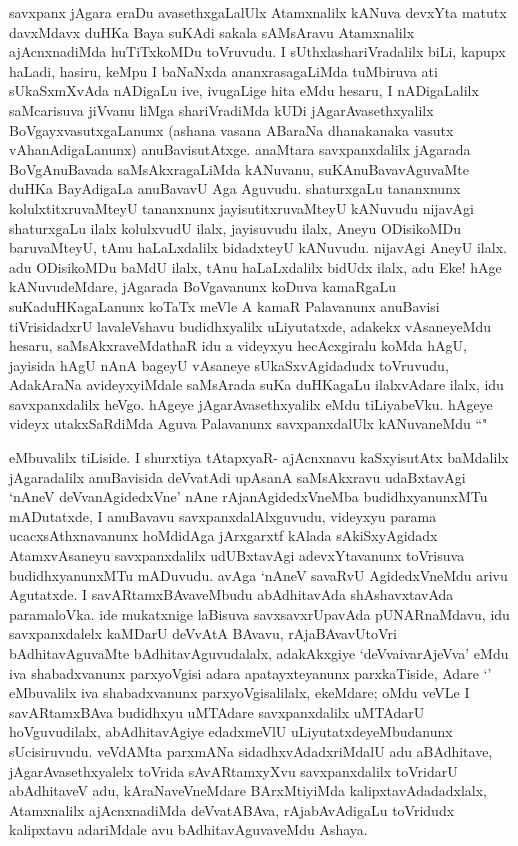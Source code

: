 \begin{artha}
savxpanx jAgara eraDu avasethxgaLalUlx Atamxnalilx kANuva devxYta matutx davxMdavx duHKa Baya suKAdi sakala sAMsAravu Atamxnalilx ajAcnxnadiMda huTiTxkoMDu toVruvudu. I sUthxlashariVradalilx biLi, kapupx haLadi, hasiru, keMpu I baNaNxda ananxrasagaLiMda tuMbiruva ati sUkaSxmXvAda nADigaLu ive, ivugaLige hita eMdu hesaru, I nADigaLalilx saMcarisuva jiVvanu liMga shariVradiMda kUDi jAgarAvasethxyalilx BoVgayxvasutxgaLanunx (ashana vasana ABaraNa dhanakanaka vasutx vAhanAdigaLanunx) anuBavisutAtxge. anaMtara savxpanxdalilx jAgarada BoVgAnuBavada saMsAkxragaLiMda kANuvanu, suKAnuBavavAguvaMte duHKa BayAdigaLa anuBavavU Aga Aguvudu. shaturxgaLu tananxnunx kolulxtitxruvaMteyU tananxnunx jayisutitxruvaMteyU kANuvudu nijavAgi shaturxgaLu ilalx kolulxvudU ilalx, jayisuvudu ilalx, Aneyu ODisikoMDu baruvaMteyU, tAnu haLaLxdalilx bidadxteyU kANuvudu. nijavAgi AneyU ilalx. adu ODisikoMDu baMdU ilalx, tAnu haLaLxdalilx bidUdx ilalx, adu Eke! hAge kANuvudeMdare, jAgarada BoVgavanunx koDuva kamaRgaLu suKaduHKagaLanunx koTaTx meVle A kamaR Palavanunx anuBavisi tiVrisidadxrU lavaleVshavu budidhxyalilx uLiyutatxde, adakekx vAsaneyeMdu hesaru, saMsAkxraveMdathaR idu a videyxyu hecAcxgiralu koMda hAgU, jayisida hAgU nAnA bageyU vAsaneye sUkaSxvAgidadudx toVruvudu, AdakAraNa avideyxyiMdale saMsArada suKa duHKagaLu ilalxvAdare ilalx, idu savxpanxdalilx heVgo. hAgeye jAgarAvasethxyalilx eMdu tiLiyabeVku. hAgeye videyx utakxSaRdiMda Aguva Palavanunx savxpanxdalUlx kANuvaneMdu ``\stext " 
\end{artha}%

\begin{artha}
eMbuvalilx tiLiside. I shurxtiya tAtapxyaR- ajAcnxnavu kaSxyisutAtx baMdalilx jAgaradalilx anuBavisida deVvatAdi upAsanA saMsAkxravu udaBxtavAgi `nAneV deVvanAgidedxVne' nAne rAjanAgidedxVneMba budidhxyanunxMTu mADutatxde, I anuBavavu savxpanxdalAlxguvudu, videyxyu parama ucacxsAthxnavanunx hoMdidAga jArxgarxtf kAlada sAkiSxyAgidadx AtamxvAsaneyu savxpanxdalilx udUBxtavAgi adevxYtavanunx toVrisuva budidhxyanunxMTu mADuvudu. avAga `nAneV savaRvU AgidedxVneMdu arivu Agutatxde. I savARtamxBAvaveMbudu abAdhitavAda shAshavxtavAda paramaloVka. ide mukatxnige laBisuva savxsavxrUpavAda pUNARnaMdavu, idu savxpanxdalelx kaMDarU deVvAtA BAvavu, rAjaBAvavUtoVri bAdhitavAguvaMte bAdhitavAguvudalalx, adakAkxgiye `deVvaivarAjeVva' eMdu iva shabadxvanunx parxyoVgisi adara apatayxteyanunx parxkaTiside, Adare `\stext ' eMbuvalilx iva shabadxvanunx parxyoVgisalilalx, ekeMdare; oMdu veVLe I savARtamxBAva budidhxyu uMTAdare savxpanxdalilx uMTAdarU hoVguvudilalx, abAdhitavAgiye edadxmeVlU uLiyutatxdeyeMbudanunx sUcisiruvudu. veVdAMta parxmANa sidadhxvAdadxriMdalU adu aBAdhitave, jAgarAvasethxyalelx toVrida sAvARtamxyXvu savxpanxdalilx toVridarU abAdhitaveV adu, kAraNaveVneMdare BArxMtiyiMda kalipxtavAdadadxlalx, Atamxnalilx ajAcnxnadiMda deVvatABAva, rAjabAvAdigaLu toVridudx kalipxtavu adariMdale avu bAdhitavAguvaveMdu Ashaya. 
\end{artha}

